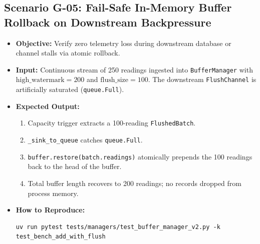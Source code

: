 \documentclass[11pt,a4paper]{article}
\begin{document}
\subsection{Scenario G-05: Fail-Safe In-Memory Buffer Rollback on Downstream Backpressure}
\begin{itemize}[leftmargin=*,itemsep=1.5pt]
  \item \textbf{Objective:} Verify zero telemetry loss during downstream database or channel stalls via atomic rollback.
  \item \textbf{Input:} Continuous stream of 250 readings ingested into \texttt{BufferManager} with $\text{high\_watermark} = 200$ and $\text{flush\_size} = 100$. The downstream \texttt{FlushChannel} is artificially saturated (\texttt{queue.Full}).
  \item \textbf{Expected Output:}
  \begin{enumerate}[label=\alph*.,leftmargin=1.5em]
    \item Capacity trigger extracts a 100-reading \texttt{FlushedBatch}.
    \item \texttt{\_sink\_to\_queue} catches \texttt{queue.Full}.
    \item \texttt{buffer.restore(batch.readings)} atomically prepends the 100 readings back to the head of the buffer.
    \item Total buffer length recovers to 200 readings; no records dropped from process memory.
  \end{enumerate}
  \item \textbf{How to Reproduce:}
\begin{lstlisting}
uv run pytest tests/managers/test_buffer_manager_v2.py -k test_bench_add_with_flush
\end{lstlisting}
\end{itemize}
\end{document}
